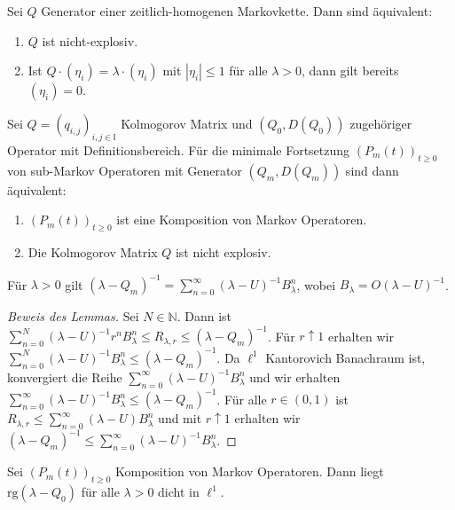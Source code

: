 \begin{prop}
  Sei $Q$ Generator einer zeitlich-homogenen Markovkette. Dann sind äquivalent:
  \begin{enumerate}
      \item $Q$ ist nicht-explosiv.
      \item Ist $Q\cdot(\eta_i)=\lambda \cdot(\eta_i)$ mit $|\eta_i|\leq 1$ für alle $\lambda>0$, dann gilt bereits $(\eta_i)=0$.
  \end{enumerate}
\end{prop}

\begin{satz}
  Sei $Q=(q_{i,j})_{i,j\in\mathbb I}$ Kolmogorov Matrix und  $(Q_0, D(Q_0))$ zugehöriger Operator mit Definitionsbereich. Für die minimale Fortsetzung $(P_m(t))_{t\geq0}$ von sub-Markov Operatoren mit Generator $(Q_m, D(Q_m))$ sind dann äquivalent:
  \begin{enumerate}
      \item $(P_m(t))_{t\geq0}$ ist eine Komposition von Markov Operatoren.
      \item  Die Kolmogorov Matrix $Q$ ist nicht explosiv.
  \end{enumerate}
\end{satz}

\begin{lem} 
  Für $\lambda >0$ gilt  $(\lambda-Q_m)^{-1}=\sum_{n=0}^\infty (\lambda - U)^{-1} B_\lambda^n$, wobei $B_\lambda = O(\lambda-U)^{-1}$.
\end{lem}

\begin{proof}[Beweis des Lemmas]
  Sei $N\in\mathbb N$. Dann ist $\sum_{n=0}^N (\lambda - U)^{-1}r^n B_\lambda ^n\leq R_{\lambda, r}\leq (\lambda- Q_m)^{-1}$. Für $r\uparrow 1$ erhalten wir $\sum_{n=0}^N (\lambda-U)^{-1} B_\lambda ^n\leq (\lambda- Q_m)^{-1}$. Da $\ell^1$ Kantorovich Banachraum ist, konvergiert die Reihe $\sum_{n=0}^\infty (\lambda-U)^{-1}B_\lambda^n$ und wir erhalten $\sum_{n=0}^\infty (\lambda-U)^{-1}B_\lambda^n\leq (\lambda-Q_m)^{-1}$. Für alle $r\in(0,1)$ ist $R_{\lambda, r}\leq\sum_{n=0}^\infty (\lambda-U)B_\lambda^n$ und mit $r\uparrow 1$ erhalten wir $(\lambda-Q_m)^{-1}\leq\sum_{n=0}^\infty (\lambda-U)^{-1}B_\lambda ^n$.
\end{proof}

\begin{lem}
  Sei $(P_m(t))_{t\geq0}$ Komposition von Markov Operatoren. Dann liegt $\text{rg}(\lambda -Q_0)$ für alle $\lambda>0$ dicht in $\ell^1$. 
\end{lem}

